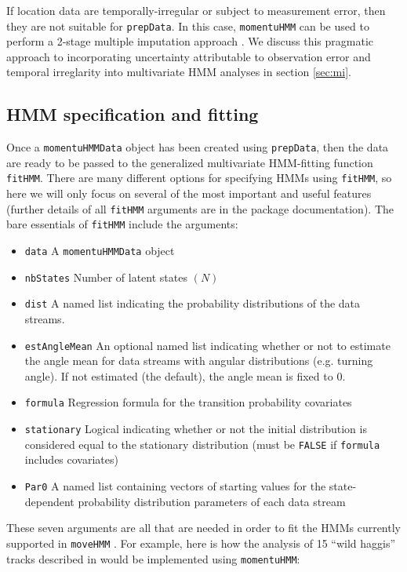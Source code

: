 \documentclass[12pt]{article}
\begin{document}
If location data are temporally-irregular or subject to measurement error, then they are not suitable for \verb|prepData|. In this case, \verb|momentuHMM| can be used to perform a 2-stage multiple imputation approach \citep{McClintock2017}. We discuss this pragmatic approach to incorporating uncertainty attributable to observation error and temporal irreglarity into multivariate HMM analyses in section \ref{sec:mi}.

\subsection{HMM specification and fitting}
Once a \verb|momentuHMMData| object has been created using \verb|prepData|, then the data are ready to be passed to the generalized multivariate HMM-fitting function \verb|fitHMM|. There are many different options for specifying HMMs using \verb|fitHMM|, so here we will only focus on several of the most important and useful features (further details of all \verb|fitHMM| arguments are in the package documentation). The bare essentials of \verb|fitHMM| include the arguments:
\begin{itemize}
  \item{\verb|data|} A \verb|momentuHMMData| object
  \item{\verb|nbStates|} Number of latent states $(N)$
  \item{\verb|dist|} A named list indicating the probability distributions of the data streams.
  \item{\verb|estAngleMean|} An optional named list indicating whether or not to estimate the angle mean for data streams with angular distributions (e.g. turning angle). If not estimated (the default), the angle mean is fixed to 0.
  \item{\verb|formula|} Regression formula for the transition probability covariates
  \item{\verb|stationary|} Logical indicating whether or not the initial distribution is considered equal to the stationary distribution (must be \verb|FALSE| if \verb|formula| includes covariates) 
  \item{\verb|Par0|} A named list containing vectors of starting values for the state-dependent probability distribution parameters of each data stream
\end{itemize}
These seven arguments are all that are needed in order to fit the HMMs currently supported in \verb|moveHMM| \citep{MichelotEtAl2016}. For example, here is how the analysis of 15 ``wild haggis'' tracks described in \cite{MichelotEtAl2016} would be implemented using \verb|momentuHMM|:
\end{document}
